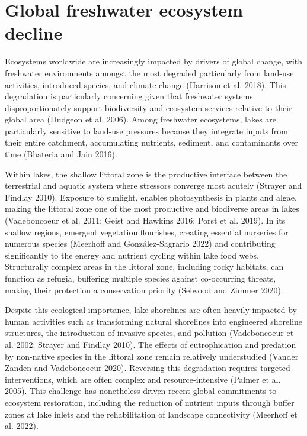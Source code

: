 \documentclass[
  12pt,
  a4paper,
  oneside]{scrbook}
\newcounter{none} %
\begin{document}
\section{Global freshwater ecosystem
decline}\label{global-freshwater-ecosystem-decline}

Ecosystems worldwide are increasingly impacted by drivers of global
change, with freshwater environments amongst the most degraded
particularly from land-use activities, introduced species, and climate
change (Harrison et al. 2018). This degradation is particularly
concerning given that freshwater systems disproportionately support
biodiversity and ecosystem services relative to their global area
(Dudgeon et al. 2006). Among freshwater ecosystems, lakes are
particularly sensitive to land-use pressures because they integrate
inputs from their entire catchment, accumulating nutrients, sediment,
and contaminants over time (Bhateria and Jain 2016).

Within lakes, the shallow littoral zone is the productive interface
between the terrestrial and aquatic system where stressors converge most
acutely (Strayer and Findlay 2010). Exposure to sunlight, enables
photosynthesis in plants and algae, making the littoral zone one of the
most productive and biodiverse areas in lakes (Vadeboncoeur et al. 2011;
Geist and Hawkins 2016; Porst et al. 2019). In its shallow regions,
emergent vegetation flourishes, creating essential nurseries for
numerous species (Meerhoff and González-Sagrario 2022) and contributing
significantly to the energy and nutrient cycling within lake food webs.
Structurally complex areas in the littoral zone, including rocky
habitats, can function as refugia, buffering multiple species against
co-occurring threats, making their protection a conservation priority
(Selwood and Zimmer 2020).

Despite this ecological importance, lake shorelines are often heavily
impacted by human activities such as transforming natural shorelines
into engineered shoreline structures, the introduction of invasive
species, and pollution (Vadeboncoeur et al. 2002; Strayer and Findlay
2010). The effects of eutrophication and predation by non-native species
in the littoral zone remain relatively understudied (Vander Zanden and
Vadeboncoeur 2020). Reversing this degradation requires targeted
interventions, which are often complex and resource-intensive (Palmer et
al. 2005). This challenge has nonetheless driven recent global
commitments to ecosystem restoration, including the reduction of
nutrient inputs through buffer zones at lake inlets and the
rehabilitation of landscape connectivity (Meerhoff et al. 2022).
\end{document}
